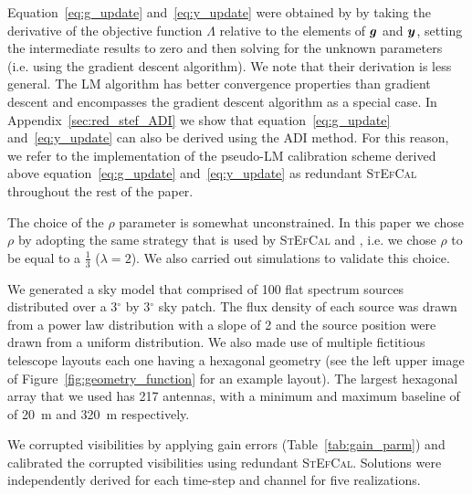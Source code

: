 \documentclass[useAMS,usenatbib]{mn2e}
\newcommand{\bg}{\bmath{g}}
\newcommand{\by}{\bmath{y}}
\begin{document}
Equation~\ref{eq:g_update} and~\ref{eq:y_update} were obtained by \citet{Marthi2014} by taking the derivative of the objective function $\Lambda$ relative to the elements of $\bg$ and $\by$, setting the intermediate results to zero and then solving for the unknown parameters (i.e. using the gradient descent algorithm). 
We note that their derivation is less general. The LM algorithm has better convergence properties than gradient descent and 
encompasses the gradient descent algorithm as a special case. In Appendix~\ref{sec:red_stef_ADI} we show that equation~\ref{eq:g_update} and~\ref{eq:y_update} can also be derived using the ADI method. 
For this reason, we refer to the implementation of the pseudo-LM calibration scheme derived above equation~\ref{eq:g_update} and~\ref{eq:y_update} as redundant \textsc{StEfCal} throughout the rest of the paper.

The choice of the $\rho$ parameter is somewhat unconstrained. In this paper we chose $\rho$ by adopting the same strategy that is used by \textsc{StEfCal} and \citet{Marthi2014},
i.e. we chose $\rho$ to be equal to a $\frac{1}{3}$ ($\lambda = 2$). We also carried out simulations to validate this choice.

We generated a sky model that comprised of 100 flat spectrum sources distributed over a 3$^{\circ}$ by 3$^{\circ}$ sky 
patch. The flux density of each source was drawn from a power law distribution with a slope of 2 and the source position were drawn from a uniform distribution. 
We also made use of multiple fictitious telescope layouts each one having a hexagonal geometry (see the left upper image of Figure~\ref{fig:geometry_function} for an example layout). The largest hexagonal array that we used has 217 antennas, with a minimum and maximum baseline of of 20~m and 320~m respectively.

We corrupted visibilities by applying gain errors (Table~\ref{tab:gain_parm}) and calibrated the corrupted visibilities using redundant \textsc{StEfCal}. Solutions were independently derived for each time-step and channel for five realizations. 
\end{document}
